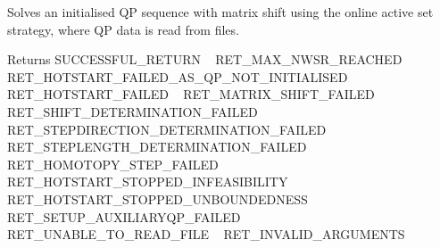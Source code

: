 Solves an initialised QP sequence with matrix shift using the online active set strategy, where QP data is read from files. \begin{DoxyReturn}{Returns}
S\+U\+C\+C\+E\+S\+S\+F\+U\+L\+\_\+\+R\+E\+T\+U\+RN ~\newline
 R\+E\+T\+\_\+\+M\+A\+X\+\_\+\+N\+W\+S\+R\+\_\+\+R\+E\+A\+C\+H\+ED ~\newline
 R\+E\+T\+\_\+\+H\+O\+T\+S\+T\+A\+R\+T\+\_\+\+F\+A\+I\+L\+E\+D\+\_\+\+A\+S\+\_\+\+Q\+P\+\_\+\+N\+O\+T\+\_\+\+I\+N\+I\+T\+I\+A\+L\+I\+S\+ED ~\newline
 R\+E\+T\+\_\+\+H\+O\+T\+S\+T\+A\+R\+T\+\_\+\+F\+A\+I\+L\+ED ~\newline
 R\+E\+T\+\_\+\+M\+A\+T\+R\+I\+X\+\_\+\+S\+H\+I\+F\+T\+\_\+\+F\+A\+I\+L\+ED ~\newline
 R\+E\+T\+\_\+\+S\+H\+I\+F\+T\+\_\+\+D\+E\+T\+E\+R\+M\+I\+N\+A\+T\+I\+O\+N\+\_\+\+F\+A\+I\+L\+ED ~\newline
 R\+E\+T\+\_\+\+S\+T\+E\+P\+D\+I\+R\+E\+C\+T\+I\+O\+N\+\_\+\+D\+E\+T\+E\+R\+M\+I\+N\+A\+T\+I\+O\+N\+\_\+\+F\+A\+I\+L\+ED ~\newline
 R\+E\+T\+\_\+\+S\+T\+E\+P\+L\+E\+N\+G\+T\+H\+\_\+\+D\+E\+T\+E\+R\+M\+I\+N\+A\+T\+I\+O\+N\+\_\+\+F\+A\+I\+L\+ED ~\newline
 R\+E\+T\+\_\+\+H\+O\+M\+O\+T\+O\+P\+Y\+\_\+\+S\+T\+E\+P\+\_\+\+F\+A\+I\+L\+ED ~\newline
 R\+E\+T\+\_\+\+H\+O\+T\+S\+T\+A\+R\+T\+\_\+\+S\+T\+O\+P\+P\+E\+D\+\_\+\+I\+N\+F\+E\+A\+S\+I\+B\+I\+L\+I\+TY ~\newline
 R\+E\+T\+\_\+\+H\+O\+T\+S\+T\+A\+R\+T\+\_\+\+S\+T\+O\+P\+P\+E\+D\+\_\+\+U\+N\+B\+O\+U\+N\+D\+E\+D\+N\+E\+SS ~\newline
 R\+E\+T\+\_\+\+S\+E\+T\+U\+P\+\_\+\+A\+U\+X\+I\+L\+I\+A\+R\+Y\+Q\+P\+\_\+\+F\+A\+I\+L\+ED ~\newline
 R\+E\+T\+\_\+\+U\+N\+A\+B\+L\+E\+\_\+\+T\+O\+\_\+\+R\+E\+A\+D\+\_\+\+F\+I\+LE ~\newline
 R\+E\+T\+\_\+\+I\+N\+V\+A\+L\+I\+D\+\_\+\+A\+R\+G\+U\+M\+E\+N\+TS 
\end{DoxyReturn}

